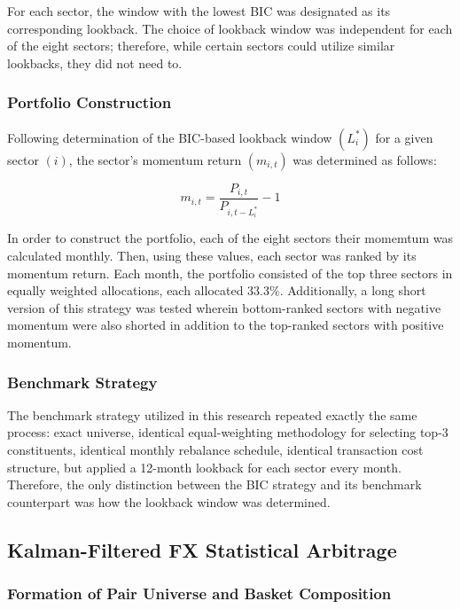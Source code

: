 \documentclass[12pt]{article}
\begin{document}
For each sector, the window with the lowest BIC was designated as its corresponding lookback. The choice of lookback window was independent for each of the eight sectors; therefore, while certain sectors could utilize similar lookbacks, they did not need to.

\subsubsection{Portfolio Construction}

Following determination of the BIC-based lookback window $(L_i^{*})$ for a given sector $(i)$, the sector's momentum return $(m_{i,t})$ was determined as follows:

\begin{equation}
m_{i,t} = \frac{P_{i,t}}{P_{i, t-L^*_i}} - 1
\end{equation}

In order to construct the portfolio, each of the eight sectors their momemtum was calculated monthly. Then, using these values, each sector was ranked by its momentum return. Each month, the portfolio consisted of the top three sectors in equally weighted allocations, each allocated 33.3\%. Additionally, a long short version of this strategy was tested wherein bottom-ranked sectors with negative momentum were also shorted in addition to the top-ranked sectors with positive momentum.

\subsubsection{Benchmark Strategy}

The benchmark strategy utilized in this research repeated exactly the same process: exact universe, identical equal-weighting methodology for selecting top-3 constituents, identical monthly rebalance schedule, identical transaction cost structure, but applied a 12-month lookback for each sector every month. Therefore, the only distinction between the BIC strategy and its benchmark counterpart was how the lookback window was determined.


\subsection{Kalman-Filtered FX Statistical Arbitrage}

\subsubsection{Formation of Pair Universe and Basket Composition}
\end{document}
